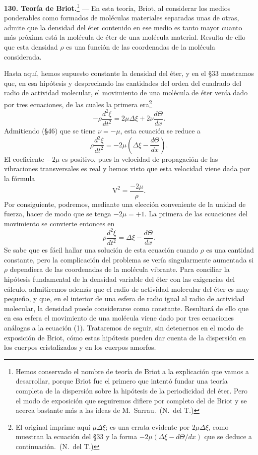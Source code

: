 \noindent\textbf{130. Teoría de Briot.}\footnote{Hemos conservado el
nombre de teoría de Briot a la explicación que vamos a desarrollar, porque
Briot fue el primero que intentó fundar una teoría completa de la
dispersión sobre la hipótesis de la periodicidad del éter. Pero el modo de
exposición que seguiremos difiere por completo del de Briot y se acerca
bastante más a las ideas de M.~Sarrau.~(N.~del T.)} — En esta teoría, Briot, al
considerar los medios ponderables como formados de moléculas materiales
separadas unas de otras, admite que la densidad del éter contenido en ese
medio es tanto mayor cuanto más próxima está la molécula de éter de una
molécula material. Resulta de ello que esta densidad $\rho$ es una función
de las coordenadas de la molécula considerada.

Hasta aquí, hemos supuesto constante la densidad del éter, y en el §33
mostramos que, en esa hipótesis y despreciando las cantidades del orden
del cuadrado del radio de actividad molecular, el movimiento de una
molécula de éter venía dado por tres ecuaciones, de las cuales la primera
era\footnote{El original imprime aquí $\mu\Delta\xi$; es una errata
evidente por $2\mu\Delta\xi$, como muestran la ecuación del §33 y la forma
$-2\mu(\Delta\xi-d\Theta/dx)$ que se deduce a continuación.~(N.~del T.)}
\[
-\rho\frac{d^2\xi}{dt^2}=2\mu\Delta\xi+2\nu\frac{d\Theta}{dx}.
\]
Admitiendo (§46) que se tiene $\nu=-\mu$, esta ecuación se reduce a
\[
\rho\frac{d^2\xi}{dt^2}=-2\mu\left(\Delta\xi-\frac{d\Theta}{dx}\right).
\]
El coeficiente $-2\mu$ es positivo, pues la velocidad de propagación de
las vibraciones transversales es real y hemos visto que esta velocidad
viene dada por la fórmula
\[
\mathrm V^2=\frac{-2\mu}{\rho}.
\]
Por consiguiente, podremos, mediante una elección conveniente de la unidad
de fuerza, hacer de modo que se tenga $-2\mu=+1$. La primera de las
ecuaciones del movimiento se convierte entonces en
\begin{equation}
\rho\frac{d^2\xi}{dt^2}=\Delta\xi-\frac{d\Theta}{dx}.
\tag{1}
\end{equation}
Se sabe que es fácil hallar una solución de esta ecuación cuando $\rho$ es
una cantidad constante, pero la complicación del problema se vería
singularmente aumentada si $\rho$ dependiera de las coordenadas de la
molécula vibrante. Para conciliar la hipótesis fundamental de la densidad
variable del éter con las exigencias del cálculo, admitiremos además que
el radio de actividad molecular del éter es muy pequeño, y que, en el
interior de una esfera de radio igual al radio de actividad molecular, la
densidad puede considerarse como constante. Resultará de ello que en esa
esfera el movimiento de una molécula viene dado por tres ecuaciones
análogas a la ecuación (1). Trataremos de seguir, sin detenernos en el modo
de exposición de Briot, cómo estas hipótesis pueden dar cuenta de la
dispersión en los cuerpos cristalizados y en los cuerpos amorfos.

